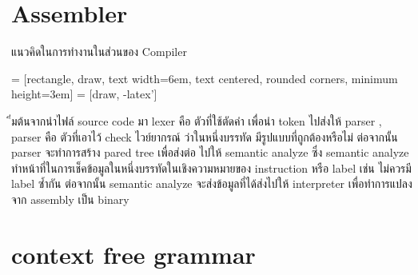 \documentclass[14pt]{article}
\begin{document}
\section{Assembler}
แนวคิดในการทำงานในส่วนของ Compiler
\begin{center}
 = [rectangle, draw, 
    text width=6em, text centered, rounded corners, minimum height=3em]
 = [draw, -latex']

\end{center}
ิ่มต้นจากนำไฟล์ source code มา
lexer คือ ตัวที่ใช้ตัดคำ เพื่อนำ token ไปส่งให้ parser , parser คือ ตัวที่เอาไว้ check ไวย์ยากรณ์ ว่าในหนึ่งบรรทัด มีรูปแบบที่ถูกต้องหรือไม่ ต่อจากนั้น parser จะทำการสร้าง pared tree เพื่อส่งต่อ ไปให้ semantic analyze ซึ่ง semantic analyze ทำหน้าที่ในการเช็คข้อมูลในหนึ่งบรรทัดในเชิงความหมายของ instruction หรือ label เช่น ไม่ควรมี label ซ้ำกัน ต่อจากนั้น semantic analyze จะส่งข้อมูลที่ได้ส่งไปให้ interpreter เพื่อทำการแปลงจาก assembly เป็น binary



\newpage
\section{context free grammar}
\end{document}
